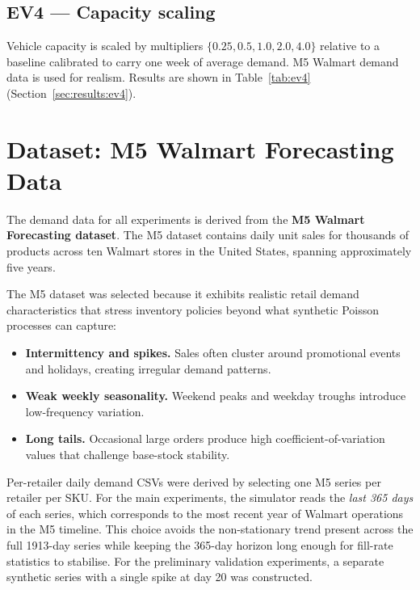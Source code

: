 \subsection{EV4 --- Capacity scaling}
\label{sec:meth:ev4}

Vehicle capacity is scaled by multipliers $\{0.25, 0.5, 1.0, 2.0, 4.0\}$
relative to a baseline calibrated to carry one week of average demand.
M5 Walmart demand data is used for realism.  Results are shown in
Table~\ref{tab:ev4} (Section~\ref{sec:results:ev4}).

\section{Dataset: M5 Walmart Forecasting Data}
\label{sec:meth:dataset}

The demand data for all experiments is derived from the
\textbf{M5 Walmart Forecasting dataset}.
The M5 dataset contains daily unit sales for thousands of products across
ten Walmart stores in the United States, spanning approximately five years.

The M5 dataset was selected because it exhibits realistic retail demand
characteristics that stress inventory policies beyond what synthetic
Poisson processes can capture:
\begin{itemize}
  \item \textbf{Intermittency and spikes.} Sales often cluster around
        promotional events and holidays, creating irregular demand patterns.
  \item \textbf{Weak weekly seasonality.} Weekend peaks and weekday troughs
        introduce low-frequency variation.
  \item \textbf{Long tails.} Occasional large orders produce high
        coefficient-of-variation values that challenge base-stock stability.
\end{itemize}

Per-retailer daily demand CSVs were derived by selecting one M5 series
per retailer per SKU.  For the main experiments, the simulator reads
the \emph{last 365 days} of each series,
which corresponds to the most recent year of Walmart operations in the
M5 timeline.  This choice avoids the non-stationary trend present
across the full 1913-day series while keeping the 365-day horizon long
enough for fill-rate statistics to stabilise.  For the preliminary
validation experiments, a separate synthetic series with a single spike at day 20 was
constructed.
\vspace{10em}
